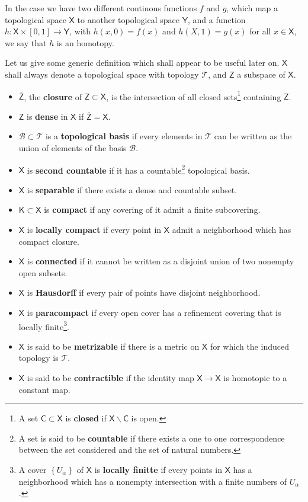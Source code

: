 \documentclass[10pt]{book}
\newcommand{\Bcal}{\mathcal{B}}
\newcommand{\Tcal}{\mathcal{T}}
\newcommand{\Csf}{\mathsf{C}}
\newcommand{\Ksf}{\mathsf{K}}
\newcommand{\Xsf}{\mathsf{X}}
\newcommand{\Ysf}{\mathsf{Y}}
\newcommand{\Zsf}{\mathsf{Z}}
\theoremstyle{break}
\begin{document}
\bigskip


In the case we have two different continous functions $f$ and $g$, which map a topological space $\Xsf$ to another topological space $\Ysf$, and a function $h : \Xsf \times [0,1] \to \Ysf$, with  $h(x,0) = f(x)$ and $h(X,1) = g(x)$ for all $x \in \Xsf$, we say that $h$ is an homotopy.


\bigskip


Let us give some generic definition which shall appear to be useful later on. $\Xsf$ shall always denote a topological space with topology $\Tcal$, and $\Zsf$ a subspace of $\Xsf$.%


\begin{itemize}
%
\item $\overline{\Zsf}$, the \textbf{closure} of $\Zsf \subset \Xsf$, is the intersection of all closed sets\footnote{A set $\Csf \subset \Xsf$ is \textbf{closed} if $\Xsf \backslash \Csf$ is open.} containing $\Zsf$.%
%
\item $\Zsf$ is \textbf{dense} in $\Xsf$ if $\overline{\Zsf} = \Xsf$.%
%
\item $\Bcal \subset \Tcal$ is a \textbf{topological basis} if every elements in $\Tcal$ can be written as the union of elements of the basis $\Bcal$.%
%
\item $\Xsf$ is \textbf{second countable} if it has a countable\footnote{A set is said to be \textbf{countable} if there exists a one to one correspondence between the set considered and the set of natural numbers.} topological basis.%
%
\item $\Xsf$ is \textbf{separable} if there exists a dense and countable subset.%
%
\item $\Ksf \subset \Xsf$ is \textbf{compact} if any covering of it admit a finite subcovering.%
%
\item $\Xsf$ is \textbf{locally compact} if every point in $\Xsf$ admit a neighborhood which has compact closure.%
%
\item $\Xsf$ is \textbf{connected} if it cannot be written as a disjoint union of two nonempty open subsets.%
%
\item $\Xsf$ is \textbf{Hausdorff} if every pair of points have disjoint neighborhood.%
%
\item $\Xsf$ is \textbf{paracompact} if every open cover has a refinement covering that is locally finite\footnote{A cover $\left\{U_\alpha\right\}$ of $\Xsf$ is \textbf{locally finitte} if every points in $\Xsf$ has a neighborhood which has a nonempty intersection with a finite numbers of $U_\alpha$.}.%
%
\item $\Xsf$ is said to be \textbf{metrizable} if there is a metric on $\Xsf$ for which the induced topology is $\Tcal$.
%
\item $\Xsf$ is said to be \textbf{contractible} if the identity map $\Xsf \to \Xsf$ is homotopic to a constant map.
\end{itemize}
\end{document}
